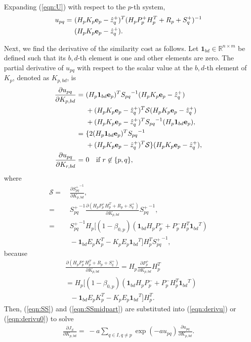 \documentclass[letterpaper, 10pt, conference]{ieeeconf}
\newcommand{\refeqn}[1]{(\ref{eqn:#1})}
\newcommand{\deriv}[2]{\ensuremath{\frac{\partial #1}{\partial #2}}}
\renewcommand{\Re}{\ensuremath{\mathbb{R}}}
\begin{document}
Expanding \refeqn{U} with respect to the $p$-th system,
\begin{align}
u_{pq}=&\ 
(H_pK_p{\bf e}_p-\hat z^+_{q})^T
(H_pP^+_{p}H_p^T+R_p+S^+_q)^{-1}\nonumber
\\
&\ 
(H_pK_p{\bf e}_p-\hat z^+_{q}).
\end{align}
\newcommand{\Ibd}{\ensuremath{\mathbf{1}_{bd}}}

Next, we find the derivative of the similarity cost as follows.
Let $\Ibd\in \Re^{n\times m}$ be defined such that its $b,d$-th element is one and other elements are zero.
The partial derivative of $u_{pq}$ with respect to the scalar value at the $b,d$-th element of $K_p$, denoted as $K_{p,bd}$, is
\begin{align}
\deriv{u_{pq}}{K_{p,bd}}
=&\ 
(H_p\Ibd{\bf e}_p)^T
{S_{pq}}^{-1}
(H_pK_p{\bf e}_p-\hat z^+_{q})\nonumber
\\
&\ +
(H_pK_p{\bf e}_p-\hat z^+_{q})^T
\mathcal{S}
(H_pK_p{\bf e}_p-\hat z^+_{q})\nonumber
\\
&\ +
(H_pK_p{\bf e}_p-\hat z^+_{q})^T
{S_{pq}}^{-1}
(H_p\Ibd{\bf e}_p),\nonumber
\\
=&\ \{
2(H_p\Ibd{\bf e}_p)^T
{S_{pq}}^{-1}\nonumber
\\
&\ +(H_pK_p{\bf e}_p-\hat z^+_{q})^T
\mathcal{S}
\}
(H_pK_p{\bf e}_p-\hat z^+_{q}),\label{eqn:derivu}
\\
\deriv{u_{pq}}{K_{r,bd}}=&\ 0\quad \mbox{if } r\not\in\{p,q\},\label{eqn:derivu0}
\end{align}
where
\begin{align}
\mathcal{S}=&\ \deriv{{S^+_{pq}}^{-1}}{K_{p,bd}},\nonumber
\\
=&\ {S^+_{pq}}^{-1}
\deriv{\left(H_pP^+_{p}H_p^T+R_p+S^+_q\right)}{K_{p,bd}}
{S^+_{pq}}^{-1},\nonumber
\\
=&\ {S^+_{pq}}^{-1}
H_p
[(1-\beta_{0,p})(\Ibd H_pP_p^-+P_p^-H_p^T\Ibd^T)\nonumber
\\
&\ -\Ibd E_pK_p^T -K_pE_p\Ibd^T]
H_p^T
{S^+_{pq}}^{-1},\label{eqn:SS}
\end{align}
because
\begin{align}
&\deriv{\left(H_pP^+_{p}H_p^T+R_p+S^+_q\right)}{K_{p,bd}}
=
H_p
\deriv{P^+_{p}}{K_{p,bd}}
H_p^T\nonumber
\\
&=
H_p
[(1-\beta_{0,p})(\Ibd H_pP_p^-+P_p^-H_p^T\Ibd^T)\nonumber
\\
&\ \ \ -\Ibd E_pK_p^T -K_pE_p\Ibd^T]
H_p^T.\label{eqn:SSmidpart}
\end{align}
Then, \refeqn{SS} and \refeqn{SSmidpart} are substituted into \refeqn{derivu} or \refeqn{derivu0} to solve
\begin{align}
\label{eqn:JSK}
\deriv{J_S}{K_{p,bd}}=\ -a\sum\limits_{q\in I,q\neq p}\exp (-au_{pq})\deriv{u_{pq}}{K_{p,bd}}.
\end{align}
\end{document}

